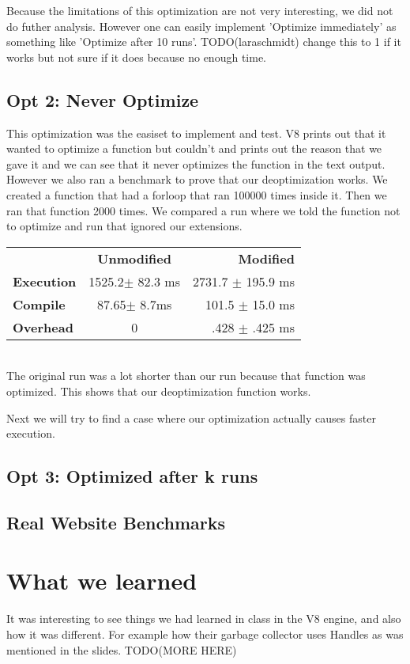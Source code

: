 \documentclass[twocolumn,showpacs,%
  nofootinbib,aps,superscriptaddress,%
  eqsecnum,prd,notitlepage,showkeys,10pt]{revtex4-1}
\begin{document}
Because the limitations of this optimization are not very interesting, we did not do futher analysis. However one can easily implement 'Optimize immediately' as something like 'Optimize after 10 runs'. TODO(laraschmidt) change this to 1 if it works but not sure if it does because no enough time.

\subsection{Opt 2: Never Optimize}
This optimization was the easiset to implement and test. V8 prints out that it wanted to optimize a function but couldn't and prints out the reason that we gave it and we can see that it never optimizes the function in the text output. However we also ran a benchmark to prove that our deoptimization works. We created a function that had a forloop that ran 100000 times inside it. Then we ran that function 2000 times. We compared a run where we told the function not to optimize and run that ignored our extensions.\\ 


\begin{tabular}{ l c r }
  & \textbf{Unmodified} & \textbf{Modified} \\
\textbf{Execution} &  1525.2$\pm$ 82.3 ms &  2731.7 $\pm$ 195.9 ms \\
\textbf{Compile} & 87.65$\pm$ 8.7ms & 101.5 $\pm$ 15.0 ms \\
\textbf{Overhead} &  0   &   .428 $\pm$ .425 ms  \\
\end{tabular}\\

The original run was a lot shorter than our run because that function was optimized. This shows that our deoptimization function works.

Next we will try to find a case where our optimization actually causes faster execution. 

\subsection{Opt 3: Optimized after k runs}

\subsection{Real Website Benchmarks}


\section {What we learned}
It was interesting to see things we had learned in class in the V8 engine, and also how it was different. For example how their garbage collector uses Handles as was mentioned in the slides.
TODO(MORE HERE)
\end{document}

